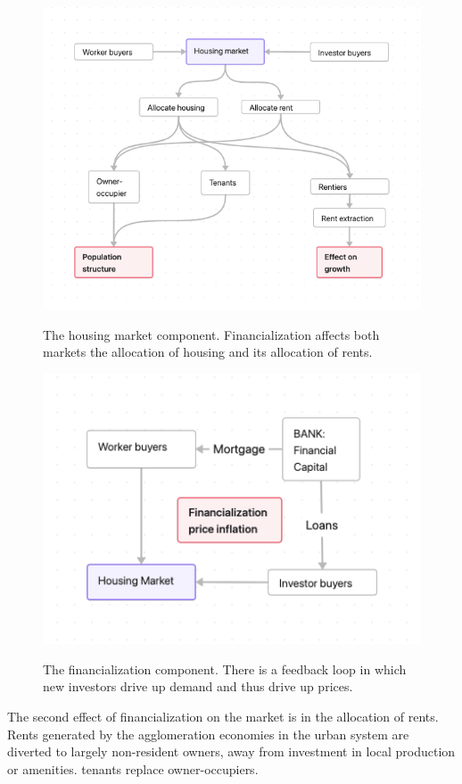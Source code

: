 \begin{figure}[!ht]
    \centering
    \includegraphics[scale=.60]{fig/flow_impacts.png}
    \label{Figure-impacts}
\caption{The housing market component. Financialization affects both markets the allocation of housing and its allocation of rents.}
\end{figure}



\begin{figure}[!ht]
    \centering
    \includegraphics[scale=.70]{fig/flow_financialization.png}
    \label{fig-financial-cycle}
    \caption{The financialization component. There is a feedback loop in which new investors drive up demand and thus drive up prices.}
\end{figure}

The second effect of financialization on the market is in the allocation of rents. Rents generated by the agglomeration economies in the urban system are diverted to largely non-resident owners, away from investment in local production or amenities. tenants replace owner-occupiers. %


